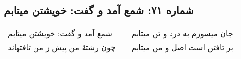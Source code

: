 \begin{center}
\section*{شماره ۷۱: شمع آمد و گفت: خویشتن میتابم}
\label{sec:071}
\begin{longtable}{l p{0.5cm} r}
شمع آمد و گفت: خویشتن میتابم
&&
جان میسوزم به درد و تن میتابم
\\
چون رشتهٔ من پیش ز من تافتهاند
&&
بر تافتن است اصل و من میتابم
\\
\end{longtable}
\end{center}
